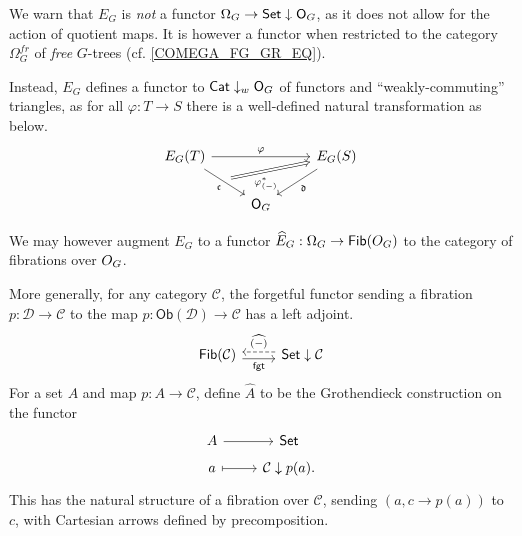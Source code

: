 \documentclass[a4paper,10pt
,draft
]{article}%
\renewcommand{\phi}{\varphi}
\renewcommand{\1}{\ensuremath{\mathbb{id}}}
\renewcommand{\hat}{\widehat}
\begin{document}
We warn that $E_G$ is \textit{not} a functor
$\Omega_G \to \mathsf{Set} \downarrow \mathsf O_G$,
as it does not allow for the action of quotient maps.
It is however a functor when restricted to the category $\Omega_G^{fr}$ of \textit{free} $G$-trees
(cf. \eqref{COMEGA_FG_GR_EQ}).

Instead, $E_G$ defines a functor to $\mathsf{Cat} \downarrow_w \mathsf O_G$ of functors and ``weakly-commuting'' triangles,
as for all $\phi: T \to S$ there is a well-defined natural transformation as below.
\begin{equation}
      \begin{tikzcd}
            E_G(T) \arrow[rr, "\phi"] \arrow[dr, "\mathfrak c"', ""{name = U}]
            &&
            |[alias = V]| E_G(S) \arrow[dl, "\mathfrak d"]
            \\
            &
            \mathsf O_G
            \arrow[Rightarrow, from = U, to = V, "\phi_{(-)}^{\**}"'{near start}]
      \end{tikzcd}
\end{equation}

We may however augment $E_G$ to a functor
$\hat E_G: \Omega_G \to \mathsf{Fib}(\mathsf \mathsf O_G)$
to the category of fibrations over $\mathsf \mathsf O_G$.

More generally, for any category $\mathcal C$, the forgetful functor
sending a fibration $p: \mathcal D \to \mathcal C$ to the map $p: \mathsf{Ob}(\mathcal D) \to \mathcal C$
has a left adjoint.
\begin{equation}
      \label{FIB_HAT_EQ}
      \begin{tikzcd}
            \mathsf{Fib}(\mathcal C) \arrow[r, shift right, "\mathsf{fgt}"']
            &
            \mathsf{Set} \downarrow \mathcal C \arrow[l, shift right, dashed, "\hat{(-)}"']
      \end{tikzcd}
\end{equation}
For a set $A$ and map $p: A \to \mathcal C$, define
$\hat A$ to be the Grothendieck construction on the functor
\begin{equation}
      \begin{tikzcd}[row sep = tiny]
            A \arrow[r]
            &
            \mathsf{Set}
            \\
            a \arrow[r, mapsto]
            &
            \mathcal C \downarrow p(a).
      \end{tikzcd}
\end{equation}
This has the natural structure of a fibration over $\mathcal C$,
sending $(a, c \to p(a))$ to $c$, with
Cartesian arrows defined by precomposition.
\end{document}
